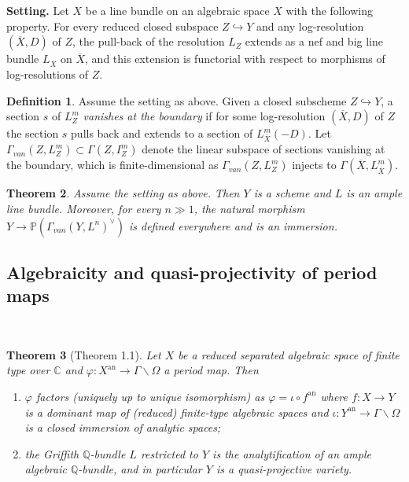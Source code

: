 \documentclass{amsart}
\newtheorem{theorem}{Theorem}[subsection]
\theoremstyle{definition}
\newtheorem{definition}[theorem]{Definition}
\numberwithin{equation}{section}
\newcommand{\analytic}{\mathrm{an}}
\begin{document}
{\bfseries\noindent Setting.}
Let $X$ be a line bundle on an algebraic space $X$ with the following property.
For every reduced closed subspace $Z \hookrightarrow Y$
and any log-resolution $(\overline{X},D)$ of $Z$,
the pull-back of the resolution $L_Z$ extends as a nef and big line bundle $L_{\overline{X}}$ on $\overline{X}$,
and this extension is functorial with respect to morphisms of log-resolutions of $Z$.

\begin{definition}
	Assume the setting as above.
	Given a closed subscheme $Z \hookrightarrow Y$,
	a section $s$ of $L^m_Z$ \emph{vanishes at the boundary}
	if for some log-resolution $(\overline{X},D)$ of $Z$
	the section $s$ pulls back and extends to a section of $L^m_{\overline{X}}(-D)$.
	Let $\Gamma_{van}(Z,L^m_Z) \subset \Gamma(Z,I^m_Z)$ denote the linear subspace of sections vanishing at the boundary,
	which is finite-dimensional as $\Gamma_{van}(Z,L^m_Z)$ injects to $\Gamma(\overline{X},L^m_{\overline{X}})$.
\end{definition}

\begin{theorem}
	Assume the setting as above.
	Then $Y$ is a scheme and $L$ is an ample line bundle.
	Moreover, for every $n \gg 1$,
	the natural morphism $Y \to \mathbb{P}(\Gamma_{van}(Y,L^n)^{\vee})$ is defined everywhere and is an immersion.
\end{theorem}

\subsection{Algebraicity and quasi-projectivity of period maps}~

\begin{tcolorbox}[title = {\Large Goal}]
	\begin{theorem}[Theorem 1.1]
		Let $X$ be a reduced separated algebraic space of finite type over $\mathbb{C}$
		and $\varphi: X^\analytic \to \Gamma \backslash \Omega$ a period map. Then
		\begin{enumerate}
			\item 
			$\varphi$ factors (uniquely up to unique isomorphism) as
			$\varphi = \iota \circ f^\analytic$
			where $f: X \to Y$ is a dominant map of (reduced) finite-type algebraic spaces
			and $\iota: Y^\analytic \to \Gamma \backslash \Omega$ is a closed immersion of analytic spaces;
			\item
			the Griffith $\mathbb{Q}$-bundle $L$ restricted to $Y$ 
			is the analytification of an ample algebraic $\mathbb{Q}$-bundle,
			and in particular $Y$ is a quasi-projective variety.
		\end{enumerate}
	\end{theorem}
\end{tcolorbox}
\end{document}
